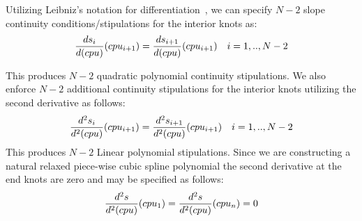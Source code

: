 \documentclass[conference]{IEEEtran}
\begin{document}
Utilizing Leibniz's notation for differentiation~\cite{thurston1973leibniz}, we can specify $N-2$ slope continuity conditions/stipulations for the interior knots as:
\begin{equation}
\label{condition_3}
\frac{ds_i}{d(cpu)} (cpu_{i+1}) =  \frac{ds_{i+1}}{d(cpu)} (cpu_{i+1}) \quad i = 1,..,N-2 \newline
\end{equation} 

This produces $N-2$ quadratic polynomial continuity stipulations. We also enforce $N-2$ additional continuity stipulations for the interior knots utilizing the second derivative as follows:  
\begin{equation}
\label{condition_4}
\frac{d^2s_i}{d^2(cpu)} (cpu_{i+1}) =  \frac{d^2s_{i+1}}{d^2(cpu)} (cpu_{i+1}) \quad i = 1,..,N-2 \newline
\end{equation} 
This produces $N-2$ Linear polynomial stipulations. Since we are constructing a natural relaxed piece-wise cubic spline polynomial the second derivative at the end knots are zero and may be specified as follows:
\begin{equation}
\label{condition_5}
\frac{d^2s}{d^2(cpu)} (cpu_1) =  \frac{d^2s}{d^2(cpu)} (cpu_n) = 0 \newline
\end{equation} 
\end{document}
